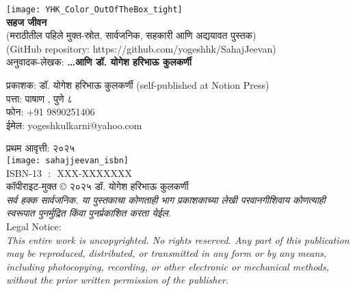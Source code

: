 \thispagestyle{empty}

\begin{center}
\texttt{[image: YHK\_Color\_OutOfTheBox\_tight]} \\[1.5em]

\textbf{\Huge सहज जीवन}\\ [0.5em]
{\small(मराठीतील पहिले मुक्त-स्रोत, सार्वजनिक, सहकारी आणि अद्ययावत  पुस्तक)}\\[0.5em]
{\small(GitHub repository: https://github.com/yogeshhk/SahajJeevan)}\\[0.5em]

अनुवादक-लेखक: \textbf{{\large \ldots  आणि  डॉ. योगेश हरिभाऊ कुलकर्णी}}\\[1.5em]
\end{center}

\vspace{1.5em}

\begin{flushleft}

प्रकाशक: डॉ. योगेश हरिभाऊ कुलकर्णी (self-published at Notion Press)\\
पत्ता:  पाषाण ,  पुणे ८ \\
फोन:  +91 9890251406\\
ईमेल: yogeshkulkarni@yahoo.com\\[1.5em]

\vspace{0.5em}

प्रथम आवृत्ती: २०२५\\[0.5em]

\texttt{[image: sahajjeevan\_isbn]} \\ [0.5em]
ISBN-13 ‏ : ‎ XXX-XXXXXXX\\[1.5em]

कॉपीराइट-मुक्त © २०२५ डॉ. योगेश हरिभाऊ कुलकर्णी\\[0.5em]

{\textit{सर्व हक्क सार्वजनिक. या पुस्तकाचा कोणताही भाग प्रकाशकाच्या लेखी परवानगीशिवाय कोणत्याही स्वरूपात पुनर्मुद्रित किंवा पुनर्प्रकाशित करता येईल.}}\\[1.5em]

{\large Legal Notice:}\\
{\textit{This entire work is uncopyrighted. No rights reserved. Any part of this publication may be reproduced, distributed, or transmitted in any form or by any means, including photocopying, recording, or other electronic or mechanical methods, without the prior written permission of the publisher.}}
\end{flushleft}
\vfill\null
\clearpage


